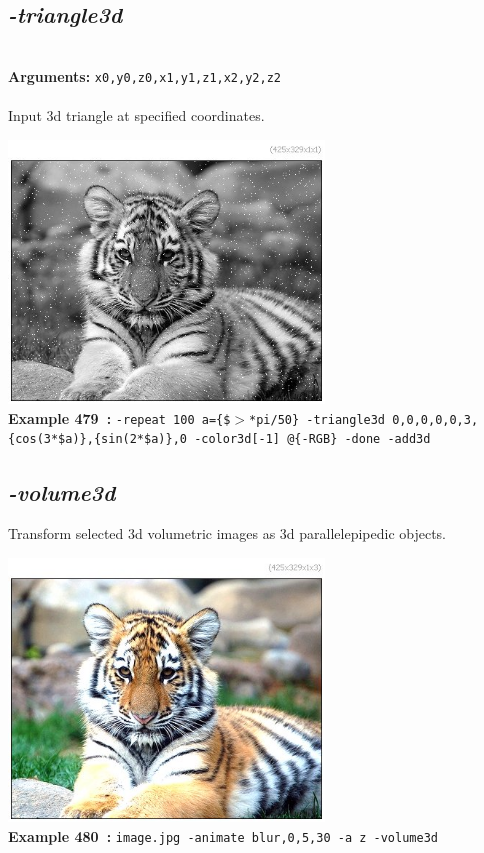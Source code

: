 \documentclass[a4paper,11pt,twoside]{book}
\begin{document}
\subsection{\emph{-triangle3d} }\vspace*{-0.5em}
~\\\textbf{Arguments: } 
{\small \texttt{x0,y0,z0,x1,y1,z1,x2,y2,z2}}\\~\\
Input 3d triangle at specified coordinates.
\begin{center}\includegraphics[keepaspectratio=true,height=7cm,width=\textwidth]{img/gmic_def479.jpg}\\
{\footnotesize \textbf{Example 479~:} \texttt{-repeat 100 a=\{\$$>$*pi/50\} -triangle3d 0,0,0,0,0,3,\{cos(3*\$a)\},\{sin(2*\$a)\},0 -color3d[-1] @\{-RGB\} -done -add3d}}
\end{center}

\subsection{\emph{-volume3d} }\vspace*{-0.5em}
Transform selected 3d volumetric images as 3d parallelepipedic objects.
\begin{center}\includegraphics[keepaspectratio=true,height=7cm,width=\textwidth]{img/gmic_def480.jpg}\\
{\footnotesize \textbf{Example 480~:} \texttt{image.jpg -animate blur,0,5,30 -a z -volume3d}}
\end{center}
\end{document}
